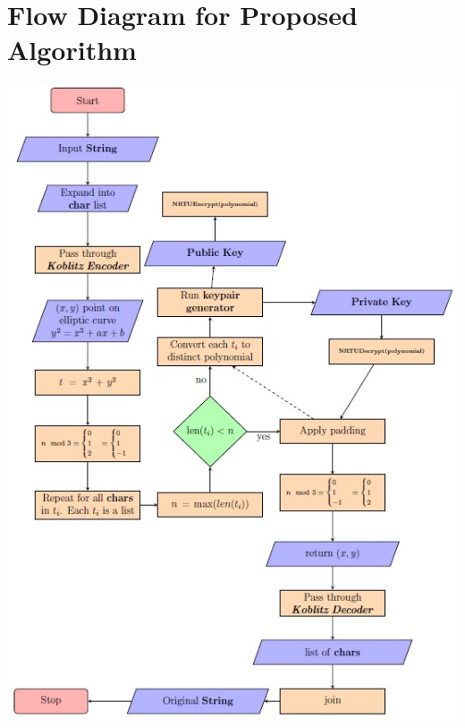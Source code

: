 \documentclass[cryptography,article,submit,moreauthors,pdftex]{Definitions/mdpi}
\begin{document}
\section{Flow Diagram for Proposed Algorithm}
\begin{center}
    \includegraphics[scale=1.25]{images/Algorithm Flow Diagram.jpg}
\end{center}

\newpage
\end{document}
